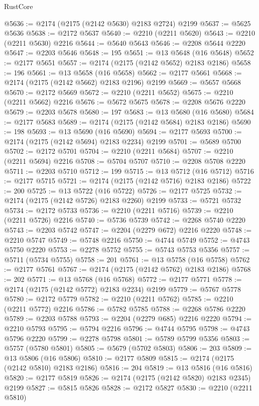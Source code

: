 \begin{lexlean}{RustCore}
\begin{coremodule}
@5636 := @2174 (@2175 (@2142 @5630) @2183 @2724) @2199
@5637 := @5625 @5636
@5638 := @2172 @5637
@5640 := @2210 (@2211 @5620)
@5643 := @2210 (@2211 @5630) @2216
@5644 := @5640 @5643
@5646 := @2208 @5644 @2220
@5647 := @2203 @5646
@5648 := 195
@5651 := @13 @5648 (@16 @5648)
@5652 := @2177 @5651
@5657 := @2174 (@2175 (@2142 @5652) @2183 @2186)
@5658 := 196
@5661 := @13 @5658 (@16 @5658)
@5662 := @2177 @5661
@5668 := @2174 (@2175 (@2142 @5662) @2183 @2196) @2199
@5669 := @5657 @5668
@5670 := @2172 @5669
@5672 := @2210 (@2211 @5652)
@5675 := @2210 (@2211 @5662) @2216
@5676 := @5672 @5675
@5678 := @2208 @5676 @2220
@5679 := @2203 @5678
@5680 := 197
@5683 := @13 @5680 (@16 @5680)
@5684 := @2177 @5683
@5689 := @2174 (@2175 (@2142 @5684) @2183 @2186)
@5690 := 198
@5693 := @13 @5690 (@16 @5690)
@5694 := @2177 @5693
@5700 := @2174 (@2175 (@2142 @5694) @2183 @2234) @2199
@5701 := @5689 @5700
@5702 := @2172 @5701
@5704 := @2210 (@2211 @5684)
@5707 := @2210 (@2211 @5694) @2216
@5708 := @5704 @5707
@5710 := @2208 @5708 @2220
@5711 := @2203 @5710
@5712 := 199
@5715 := @13 @5712 (@16 @5712)
@5716 := @2177 @5715
@5721 := @2174 (@2175 (@2142 @5716) @2183 @2186)
@5722 := 200
@5725 := @13 @5722 (@16 @5722)
@5726 := @2177 @5725
@5732 := @2174 (@2175 (@2142 @5726) @2183 @2260) @2199
@5733 := @5721 @5732
@5734 := @2172 @5733
@5736 := @2210 (@2211 @5716)
@5739 := @2210 (@2211 @5726) @2216
@5740 := @5736 @5739
@5742 := @2268 @5740 @2220
@5743 := @2203 @5742
@5747 := @2204 (@2279 @672) @2216 @2220
@5748 := @2210 @5747
@5749 := @5748 @2216
@5750 := @4744 @5749
@5752 := @4743 @5750 @2220
@5753 := @2278 @5752
@5755 := @5743 @5753 @5356
@5757 := @5711 (@5734 @5755)
@5758 := 201
@5761 := @13 @5758 (@16 @5758)
@5762 := @2177 @5761
@5767 := @2174 (@2175 (@2142 @5762) @2183 @2186)
@5768 := 202
@5771 := @13 @5768 (@16 @5768)
@5772 := @2177 @5771
@5778 := @2174 (@2175 (@2142 @5772) @2183 @2234) @2199
@5779 := @5767 @5778
@5780 := @2172 @5779
@5782 := @2210 (@2211 @5762)
@5785 := @2210 (@2211 @5772) @2216
@5786 := @5782 @5785
@5788 := @2268 @5786 @2220
@5789 := @2203 @5788
@5793 := @2204 (@2279 @685) @2216 @2220
@5794 := @2210 @5793
@5795 := @5794 @2216
@5796 := @4744 @5795
@5798 := @4743 @5796 @2220
@5799 := @2278 @5798
@5801 := @5789 @5799 @5356
@5803 := @5757 (@5780 @5801)
@5805 := @5679 (@5702 @5803)
@5806 := 203
@5809 := @13 @5806 (@16 @5806)
@5810 := @2177 @5809
@5815 := @2174 (@2175 (@2142 @5810) @2183 @2186)
@5816 := 204
@5819 := @13 @5816 (@16 @5816)
@5820 := @2177 @5819
@5826 := @2174 (@2175 (@2142 @5820) @2183 @2345) @2199
@5827 := @5815 @5826
@5828 := @2172 @5827
@5830 := @2210 (@2211 @5810)

\end{coremodule}
\end{lexlean}
